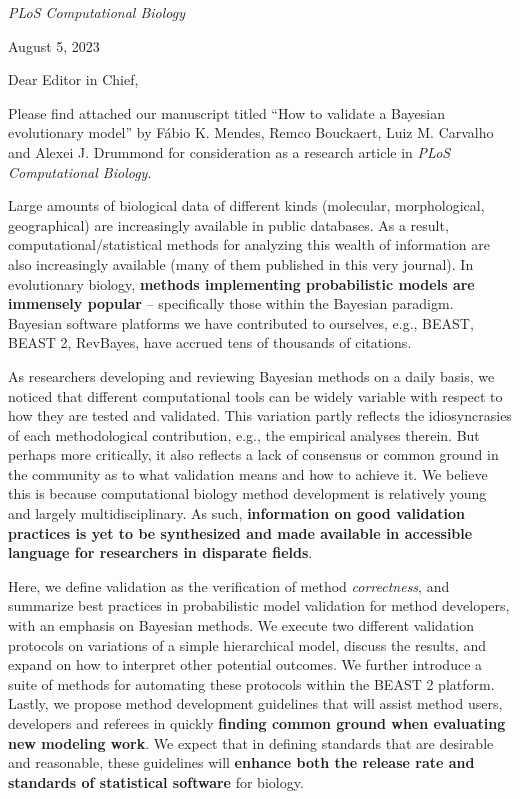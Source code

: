 \documentclass[12pt,a4paper]{article}
\begin{document}
\onehalfspacing
\emph{PLoS Computational Biology}

\begin{flushright}
August 5, 2023
\end{flushright}

Dear Editor in Chief,

\vspace{0.25cm}

Please find attached our manuscript titled ``How to validate a
Bayesian evolutionary model'' by F\'{a}bio K. Mendes, Remco Bouckaert, Luiz M. Carvalho and Alexei J. Drummond for consideration as a research article in \emph{PLoS Computational Biology}.

\vspace{0.25cm}

Large amounts of biological data of different kinds (molecular, morphological, geographical) are increasingly available in public databases.
As a result, computational/statistical methods for analyzing this wealth of information are also increasingly available (many of them published in this very journal).
In evolutionary biology, \textbf{methods implementing probabilistic
  models are immensely popular} -- specifically those within the Bayesian paradigm. %
Bayesian software platforms we have contributed to ourselves, e.g., BEAST, BEAST 2, RevBayes, have accrued tens of thousands of citations.

\vspace{0.25cm}

As researchers developing and reviewing Bayesian methods on a daily basis, we noticed that different computational tools can be widely variable with respect to how they are tested and validated.
This variation partly reflects the idiosyncrasies of each methodological contribution, e.g., the empirical analyses therein.
But perhaps more critically, it also reflects a lack of consensus or common ground in the community as to what validation means and how to achieve it.
We believe this is because computational biology method development is relatively young and largely multidisciplinary.
As such, \textbf{information on good validation practices is yet to be synthesized and made available in accessible language for researchers in disparate fields}.

\vspace{0.25cm}

Here, we define validation as the verification of method \emph{correctness}, and summarize best practices in probabilistic model validation for method developers, with an emphasis on Bayesian methods.
We execute two different validation protocols on variations of a simple hierarchical model, discuss the results, and expand on how to interpret other potential outcomes.
We further introduce a suite of methods for automating these protocols within the BEAST 2 platform.
Lastly, we propose method development guidelines that will assist method users, developers and referees in quickly \textbf{finding common ground when evaluating new modeling work}.
We expect that in defining standards that are desirable and reasonable, these guidelines will \textbf{enhance both the release rate and standards of statistical software} for biology.
\end{document}
